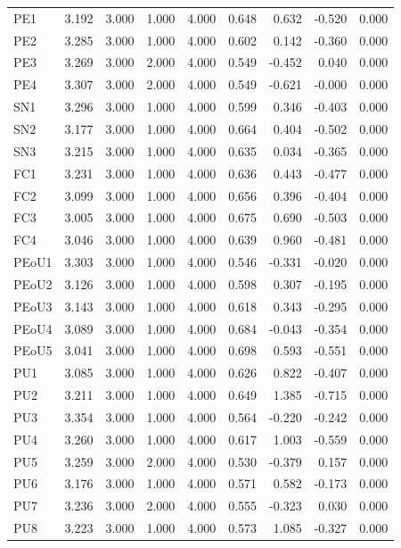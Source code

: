 \documentclass[english]{textolivre}
\begin{document}
\begin{longtable}{lrrrrrrrr}
PE1   & 3.192 & 3.000 & 1.000 & 4.000 & 0.648 & 0.632 & -0.520 & 0.000 \\
PE2   & 3.285 & 3.000 & 1.000 & 4.000 & 0.602 & 0.142 & -0.360 & 0.000 \\
PE3   & 3.269 & 3.000 & 2.000 & 4.000 & 0.549 & -0.452 & 0.040 & 0.000 \\
PE4   & 3.307 & 3.000 & 2.000 & 4.000 & 0.549 & -0.621 & -0.000 & 0.000 \\

SN1   & 3.296 & 3.000 & 1.000 & 4.000 & 0.599 & 0.346 & -0.403 & 0.000 \\
SN2   & 3.177 & 3.000 & 1.000 & 4.000 & 0.664 & 0.404 & -0.502 & 0.000 \\
SN3   & 3.215 & 3.000 & 1.000 & 4.000 & 0.635 & 0.034 & -0.365 & 0.000 \\

FC1   & 3.231 & 3.000 & 1.000 & 4.000 & 0.636 & 0.443 & -0.477 & 0.000 \\
FC2   & 3.099 & 3.000 & 1.000 & 4.000 & 0.656 & 0.396 & -0.404 & 0.000 \\
FC3   & 3.005 & 3.000 & 1.000 & 4.000 & 0.675 & 0.690 & -0.503 & 0.000 \\
FC4   & 3.046 & 3.000 & 1.000 & 4.000 & 0.639 & 0.960 & -0.481 & 0.000 \\

PEoU1 & 3.303 & 3.000 & 1.000 & 4.000 & 0.546 & -0.331 & -0.020 & 0.000 \\
PEoU2 & 3.126 & 3.000 & 1.000 & 4.000 & 0.598 & 0.307 & -0.195 & 0.000 \\
PEoU3 & 3.143 & 3.000 & 1.000 & 4.000 & 0.618 & 0.343 & -0.295 & 0.000 \\
PEoU4 & 3.089 & 3.000 & 1.000 & 4.000 & 0.684 & -0.043 & -0.354 & 0.000 \\
PEoU5 & 3.041 & 3.000 & 1.000 & 4.000 & 0.698 & 0.593 & -0.551 & 0.000 \\

PU1   & 3.085 & 3.000 & 1.000 & 4.000 & 0.626 & 0.822 & -0.407 & 0.000 \\
PU2   & 3.211 & 3.000 & 1.000 & 4.000 & 0.649 & 1.385 & -0.715 & 0.000 \\
PU3   & 3.354 & 3.000 & 1.000 & 4.000 & 0.564 & -0.220 & -0.242 & 0.000 \\
PU4   & 3.260 & 3.000 & 1.000 & 4.000 & 0.617 & 1.003 & -0.559 & 0.000 \\
PU5   & 3.259 & 3.000 & 2.000 & 4.000 & 0.530 & -0.379 & 0.157 & 0.000 \\
PU6   & 3.176 & 3.000 & 1.000 & 4.000 & 0.571 & 0.582 & -0.173 & 0.000 \\
PU7   & 3.236 & 3.000 & 2.000 & 4.000 & 0.555 & -0.323 & 0.030 & 0.000 \\
PU8   & 3.223 & 3.000 & 1.000 & 4.000 & 0.573 & 1.085 & -0.327 & 0.000 \\


\end{longtable}
\end{document}
